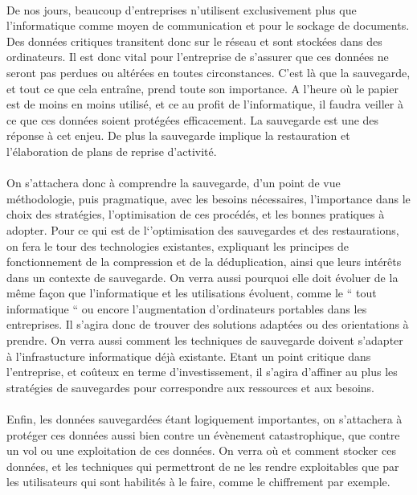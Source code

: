 \documentclass[a4paper,11pt]{report}
\begin{document}
\paragraph{}
De nos jours, beaucoup d'entreprises n'utilisent exclusivement plus que l'informatique comme moyen de communication et pour le sockage de documents.
Des données critiques transitent donc sur le réseau et sont stockées dans des ordinateurs.
Il est donc vital pour l'entreprise de s'assurer que ces données ne seront pas perdues ou altérées en toutes circonstances.
C'est là que la sauvegarde, et tout ce que cela entraîne, prend toute son importance. 
A l'heure où le papier est de moins en moins utilisé, et ce au profit de l'informatique, il faudra veiller à ce que ces données soient protégées efficacement.
La sauvegarde est une des réponse à cet enjeu. De plus la sauvegarde implique la restauration et l'élaboration de plans de reprise d'activité.

\paragraph{}
On s'attachera donc à comprendre la sauvegarde, d'un point de vue méthodologie, puis pragmatique, avec les besoins nécessaires, l'importance dans le choix des stratégies, l'optimisation de ces procédés, et les bonnes pratiques à adopter.
Pour ce qui est de l`'optimisation des sauvegardes et des restaurations, on fera le tour des technologies existantes, expliquant les principes de fonctionnement de la compression et de la déduplication, ainsi que leurs intérêts dans un contexte de sauvegarde.
On verra aussi pourquoi elle doit évoluer de la même façon que l'informatique et les utilisations évoluent, comme le `` tout informatique `` ou encore l'augmentation d'ordinateurs portables dans les entreprises. 
Il s'agira donc de trouver des solutions adaptées ou des orientations à prendre.
On verra aussi comment les techniques de sauvegarde doivent s'adapter à l'infrastucture informatique déjà existante. 
Etant un point critique dans l'entreprise, et coûteux en terme d'investissement, il s'agira d'affiner au plus les stratégies de sauvegardes pour correspondre aux ressources et aux besoins.

\paragraph{}
Enfin, les données sauvegardées étant logiquement importantes, on s'attachera à protéger ces données aussi bien contre un évènement catastrophique, que contre un vol ou une exploitation de ces données.
On verra où et comment stocker ces données, et les techniques qui permettront de ne les rendre exploitables que par les utilisateurs qui sont habilités à le faire, comme le chiffrement par exemple.
\end{document}
